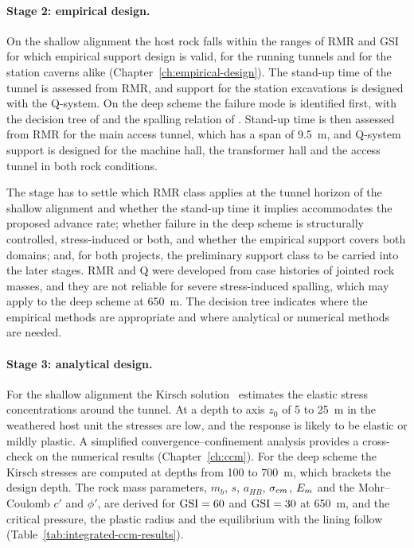 \paragraph{Stage 2: empirical design.}
On the shallow alignment the host rock falls within the ranges of RMR and GSI
for which empirical support design is valid, for the running tunnels and for
the station caverns alike (Chapter~\ref{ch:empirical-design}). The stand-up
time of the tunnel is assessed from RMR, and support for the station
excavations is designed with the Q-system. On the deep scheme the failure
mode is identified first, with the decision tree of \citet{martin2003stress}
and the spalling relation of \citet{martin1999spalling}. Stand-up time is then assessed from RMR for the
main access tunnel, which has a span of 9.5~m, and Q-system support is
designed for the machine hall, the transformer hall and the access tunnel in
both rock conditions.

The stage has to settle which RMR class applies at the tunnel horizon of the
shallow alignment and whether the stand-up time it implies accommodates the
proposed advance rate; whether failure in the deep scheme is structurally
controlled, stress-induced or both, and whether the empirical support covers
both domains; and, for both projects, the preliminary support class to be
carried into the later stages. RMR and Q were developed from case histories
of jointed rock masses, and they are not reliable for severe stress-induced
spalling, which may apply to the deep scheme at 650~m. The decision tree
indicates where the empirical methods are appropriate and where analytical or
numerical methods are needed.

\paragraph{Stage 3: analytical design.}
For the shallow alignment the Kirsch solution~\citep{kirsch1898} estimates
the elastic stress concentrations around the tunnel. At a depth to axis
$z_0$ of 5 to 25~m in the weathered host unit the stresses are low, and the
response is likely to be elastic or mildly plastic. A simplified
convergence--confinement analysis provides a cross-check on the numerical
results (Chapter~\ref{ch:ccm}). For the deep scheme the Kirsch stresses are
computed at depths from 100 to 700~m, which brackets the design depth. The
rock mass parameters, $m_b$, $s$, $a_{HB}$, $\sigma_{cm}$, $E_{m}$ and the
Mohr--Coulomb $c'$ and $\phi'$, are derived for $\mathrm{GSI} = 60$ and $\mathrm{GSI} = 30$
at 650~m, and the critical pressure, the plastic radius and the equilibrium
with the lining follow (Table~\ref{tab:integrated-ccm-results}).

